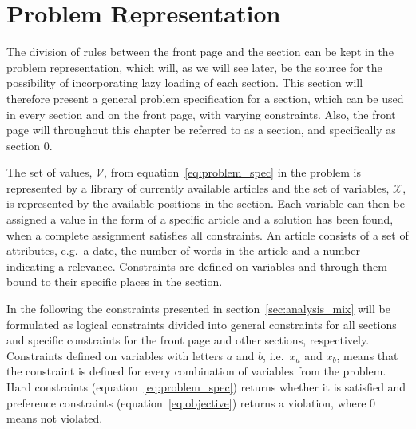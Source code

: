 \section{Problem Representation}
\label{sec:problem_representation}
The division of rules between the front page and the section can be kept in the problem representation, which will, as we will see later, be the source for the possibility of incorporating lazy loading of each section. This section will therefore present a general problem specification for a section, which can be used in every section and on the front page, with varying constraints. Also, the front page will throughout this chapter be referred to as a section, and specifically as section $0$.

The set of values, $\mathcal{V}$, from equation~\ref{eq:problem_spec} in the problem is represented by a library of currently available articles and the set of variables, $\mathcal{X}$, is represented by the available positions in the section. Each variable can then be assigned a value in the form of a specific article and a solution has been found, when a complete assignment satisfies all constraints. An article consists of a set of attributes, e.g.\ a date, the number of words in the article and a number indicating a relevance. Constraints are defined on variables and through them bound to their specific places in the section.

In the following the constraints presented in section~\vref{sec:analysis_mix} will be formulated as logical constraints divided into general constraints for all sections and specific constraints for the front page and other sections, respectively. Constraints defined on variables with letters $a$ and $b$, i.e.\ $x_a$ and $x_b$, means that the constraint is defined for every combination of variables from the problem. Hard constraints (equation~\ref{eq:problem_spec}) returns whether it is satisfied and preference constraints (equation~\ref{eq:objective}) returns a violation, where $0$ means not violated.

